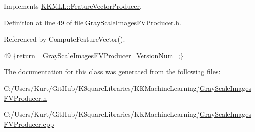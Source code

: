 Implements \hyperlink{class_k_k_m_l_l_1_1_feature_vector_producer_a8e2f54e185b2fb5de854d9978b4fbac8}{K\+K\+M\+L\+L\+::\+Feature\+Vector\+Producer}.



Definition at line 49 of file Gray\+Scale\+Images\+F\+V\+Producer.\+h.



Referenced by Compute\+Feature\+Vector().


\begin{DoxyCode}
49 \{\textcolor{keywordflow}{return} \hyperlink{_gray_scale_images_f_v_producer_8h_abe2ad7e75260504d7f992932855312f9}{\_GrayScaleImagesFVProducer\_VersionNum\_};\}
\end{DoxyCode}


The documentation for this class was generated from the following files\+:\begin{DoxyCompactItemize}
\item 
C\+:/\+Users/\+Kurt/\+Git\+Hub/\+K\+Square\+Libraries/\+K\+K\+Machine\+Learning/\hyperlink{_gray_scale_images_f_v_producer_8h}{Gray\+Scale\+Images\+F\+V\+Producer.\+h}\item 
C\+:/\+Users/\+Kurt/\+Git\+Hub/\+K\+Square\+Libraries/\+K\+K\+Machine\+Learning/\hyperlink{_gray_scale_images_f_v_producer_8cpp}{Gray\+Scale\+Images\+F\+V\+Producer.\+cpp}\end{DoxyCompactItemize}
